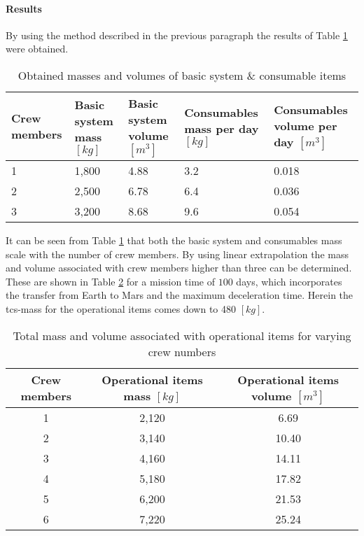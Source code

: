\paragraph{Results}
By using the method described in the previous paragraph the results of Table \ref{tab:operationalest} were obtained.
\begin{table}[h]
	\centering
	\caption{Obtained masses and volumes of basic system \& consumable items}
	\begin{tabular}{|p{1.9cm}|p{2.7cm}|p{2.7cm}|p{3.5cm}|p{3.6cm}|}
		\hline
		\textbf{Crew members} & \textbf{Basic system mass $[kg]$} & \textbf{Basic system volume $[m^{3}]$} & \textbf{Consumables mass per day $[kg]$} & \textbf{Consumables volume per day $[m^{3}]$} \\ \hline \hline
		1 & 1,800 & 4.88 & 3.2 & 0.018 \\
		2 & 2,500 & 6.78 & 6.4 & 0.036 \\
		3 & 3,200 & 8.68 & 9.6 & 0.054 \\
		\hline
	\end{tabular}
	\label{tab:operationalest}
\end{table}
It can be seen from Table \ref{tab:operationalest} that both the basic system and consumables mass scale with the number of crew members. By using linear extrapolation the mass and volume associated with crew members higher than three can be determined. These are shown in Table \ref{tab:crewmemberops} for a mission time of $100$ days, which incorporates the transfer from Earth to Mars and the maximum deceleration time. Herein the \gls{tcs}-mass for the operational items comes down to 480 $[kg]$.\\

\begin{table}[h!]
	\caption{Total mass and volume associated with operational items for varying crew numbers}
	\begin{tabular}{|c|c|c|}
		\hline
		\textbf{Crew members} & \textbf{Operational items mass $[kg]$} & \textbf{Operational items volume $[m^{3}]$}\\ \hline \hline
		1 & 2,120 & 6.69\\
		2 & 3,140 & 10.40\\
		3 & 4,160 & 14.11\\
		4 & 5,180 & 17.82\\
		5 & 6,200 & 21.53\\
		6 & 7,220 & 25.24\\ \hline
	\end{tabular}
	\label{tab:crewmemberops}
\end{table}